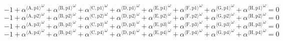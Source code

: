\begin{equation}
-1 + {{\alpha}^{\langle \mathrm{\mathrm{A}},\mathrm{\mathrm{p1}}\rangle}}^{\omega} + {{\alpha}^{\langle \mathrm{\mathrm{B}},\mathrm{\mathrm{p1}}\rangle}}^{\omega} + {{\alpha}^{\langle \mathrm{\mathrm{C}},\mathrm{\mathrm{p1}}\rangle}}^{\omega} + {{\alpha}^{\langle \mathrm{\mathrm{D}},\mathrm{\mathrm{p1}}\rangle}}^{\omega} + {{\alpha}^{\langle \mathrm{\mathrm{E}},\mathrm{\mathrm{p1}}\rangle}}^{\omega} + {{\alpha}^{\langle \mathrm{\mathrm{F}},\mathrm{\mathrm{p1}}\rangle}}^{\omega} + {{\alpha}^{\langle \mathrm{\mathrm{G}},\mathrm{\mathrm{p1}}\rangle}}^{\omega} + {{\alpha}^{\langle \mathrm{\mathrm{H}},\mathrm{\mathrm{p1}}\rangle}}^{\omega} = 0
\end{equation}
\begin{equation}
-1 + {{\alpha}^{\langle \mathrm{\mathrm{A}},\mathrm{\mathrm{p2}}\rangle}}^{\omega} + {{\alpha}^{\langle \mathrm{\mathrm{B}},\mathrm{\mathrm{p2}}\rangle}}^{\omega} + {{\alpha}^{\langle \mathrm{\mathrm{C}},\mathrm{\mathrm{p2}}\rangle}}^{\omega} + {{\alpha}^{\langle \mathrm{\mathrm{D}},\mathrm{\mathrm{p2}}\rangle}}^{\omega} + {{\alpha}^{\langle \mathrm{\mathrm{E}},\mathrm{\mathrm{p2}}\rangle}}^{\omega} + {{\alpha}^{\langle \mathrm{\mathrm{F}},\mathrm{\mathrm{p2}}\rangle}}^{\omega} + {{\alpha}^{\langle \mathrm{\mathrm{G}},\mathrm{\mathrm{p2}}\rangle}}^{\omega} + {{\alpha}^{\langle \mathrm{\mathrm{H}},\mathrm{\mathrm{p2}}\rangle}}^{\omega} = 0
\end{equation}
\begin{equation}
-1 + {{\alpha}^{\langle \mathrm{\mathrm{A}},\mathrm{\mathrm{p3}}\rangle}}^{\omega} + {{\alpha}^{\langle \mathrm{\mathrm{B}},\mathrm{\mathrm{p3}}\rangle}}^{\omega} + {{\alpha}^{\langle \mathrm{\mathrm{C}},\mathrm{\mathrm{p3}}\rangle}}^{\omega} + {{\alpha}^{\langle \mathrm{\mathrm{D}},\mathrm{\mathrm{p3}}\rangle}}^{\omega} + {{\alpha}^{\langle \mathrm{\mathrm{E}},\mathrm{\mathrm{p3}}\rangle}}^{\omega} + {{\alpha}^{\langle \mathrm{\mathrm{F}},\mathrm{\mathrm{p3}}\rangle}}^{\omega} + {{\alpha}^{\langle \mathrm{\mathrm{G}},\mathrm{\mathrm{p3}}\rangle}}^{\omega} + {{\alpha}^{\langle \mathrm{\mathrm{H}},\mathrm{\mathrm{p3}}\rangle}}^{\omega} = 0
\end{equation}
\begin{equation}
-1 + {{\alpha}^{\langle \mathrm{\mathrm{A}},\mathrm{\mathrm{p4}}\rangle}}^{\omega} + {{\alpha}^{\langle \mathrm{\mathrm{B}},\mathrm{\mathrm{p4}}\rangle}}^{\omega} + {{\alpha}^{\langle \mathrm{\mathrm{C}},\mathrm{\mathrm{p4}}\rangle}}^{\omega} + {{\alpha}^{\langle \mathrm{\mathrm{D}},\mathrm{\mathrm{p4}}\rangle}}^{\omega} + {{\alpha}^{\langle \mathrm{\mathrm{E}},\mathrm{\mathrm{p4}}\rangle}}^{\omega} + {{\alpha}^{\langle \mathrm{\mathrm{F}},\mathrm{\mathrm{p4}}\rangle}}^{\omega} + {{\alpha}^{\langle \mathrm{\mathrm{G}},\mathrm{\mathrm{p4}}\rangle}}^{\omega} + {{\alpha}^{\langle \mathrm{\mathrm{H}},\mathrm{\mathrm{p4}}\rangle}}^{\omega} = 0
\end{equation}

